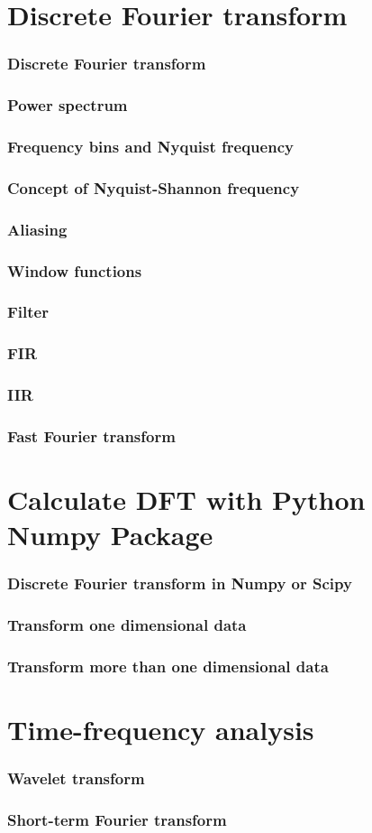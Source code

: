 \documentclass{beamer}
\begin{document}
\section{Discrete Fourier transform}
\begin{frame}
\frametitle{Discrete Fourier transform}

\end{frame}
\begin{frame}
\frametitle{Power spectrum}

\end{frame}
\begin{frame}
\frametitle{Frequency bins and Nyquist frequency}
\end{frame}
\begin{frame}
\frametitle{Concept of Nyquist-Shannon frequency}
\end{frame}
\begin{frame}
\frametitle{Aliasing}
\end{frame}
\begin{frame}
\frametitle{Window functions}

\end{frame}
\begin{frame}
\frametitle{Filter}

\end{frame}
\begin{frame}
\frametitle{FIR}
\end{frame}
\begin{frame}
\frametitle{IIR}
\end{frame}
\begin{frame}
\frametitle{Fast Fourier transform}
\end{frame}
\section{Calculate DFT with Python Numpy Package}
\begin{frame}
\frametitle{Discrete Fourier transform in Numpy or Scipy}
\end{frame}
\begin{frame}
\frametitle{Transform one dimensional data}
\end{frame}
\begin{frame}
\frametitle{Transform more than one dimensional data}
\end{frame}
\section{Time-frequency analysis}
\begin{frame}
\frametitle{Wavelet transform}
\end{frame}
\begin{frame}
\frametitle{Short-term Fourier transform}
\end{frame}
\end{document}
